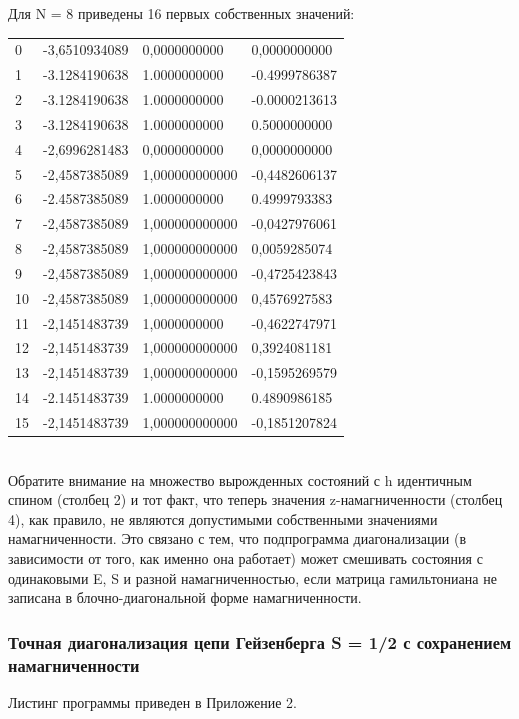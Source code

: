 \documentclass[11pt]{article}
\begin{document}
Для N = 8 приведены 16 первых собственных значений: \\
\begin{tabular}{llll}
    0 & -3,6510934089 & 0,0000000000 & 0,0000000000 \\
    1 & -3.1284190638 & 1.0000000000 & -0.4999786387 \\
    2 & -3.1284190638 & 1.0000000000 & -0.0000213613 \\
    3 & -3.1284190638 & 1.0000000000 & 0.5000000000 \\
    4 & -2,6996281483 & 0,0000000000 & 0,0000000000 \\
    5 & -2,4587385089 & 1,000000000000 & -0,4482606137 \\
    6 & -2.4587385089 & 1.0000000000 & 0.4999793383 \\
    7 & -2,4587385089 & 1,000000000000 & -0,0427976061 \\
    8 & -2,4587385089 & 1,000000000000 & 0,0059285074 \\
    9 & -2,4587385089 & 1,000000000000 & -0,4725423843 \\
   10 & -2,4587385089 & 1,000000000000 & 0,4576927583 \\
   11 & -2,1451483739 & 1,0000000000 & -0,4622747971 \\
   12 & -2,1451483739 & 1,000000000000 & 0,3924081181 \\
   13 & -2,1451483739 & 1,000000000000 & -0,1595269579 \\
   14 & -2.1451483739 & 1.0000000000 & 0.4890986185 \\
   15 & -2,1451483739 & 1,000000000000 & -0,1851207824 \\
\end{tabular} \\

 Обратите внимание на множество вырожденных состояний с h идентичным спином (столбец 2) и тот факт, что теперь значения z-намагниченности (столбец 4), как правило, не являются допустимыми собственными значениями намагниченности. Это связано с тем, что подпрограмма диагонализации (в зависимости от того, как именно она работает) может смешивать состояния с одинаковыми E, S и разной намагниченностью, если матрица гамильтониана не записана в блочно-диагональной форме намагниченности.

\subsubsection{Точная диагонализация цепи Гейзенберга S = 1/2 с сохранением намагниченности}
Листинг программы приведен в Приложение 2.
\end{document}
